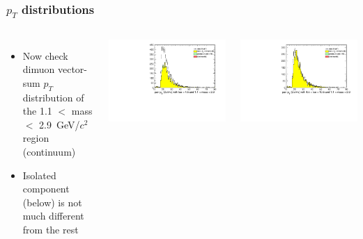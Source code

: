 \documentclass[compress]{beamer}
\begin{document}
\begin{frame}
\frametitle{$p_T$ distributions}
\begin{columns}
\begin{itemize}
\item Now check dimuon vector-sum $p_T$ distribution of the 1.1 $<$
  mass $<$ 2.9~GeV/$c^2$ region (continuum)
\item Isolated component (below) is not much different from the rest
\end{itemize}

\includegraphics[width=\linewidth]{lowdimuon_pt_midmass_isolated.pdf}

\includegraphics[width=\linewidth]{lowdimuon_pt_midmass_isosideband.pdf}


\end{columns}
\end{frame}
\end{document}
